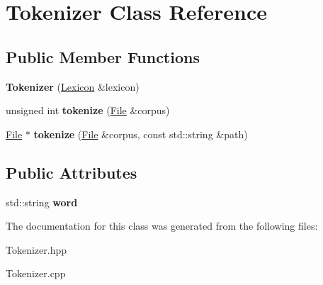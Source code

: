\hypertarget{classTokenizer}{}\section{Tokenizer Class Reference}
\label{classTokenizer}
\subsection*{Public Member Functions}
\begin{DoxyCompactItemize}
\item 
\mbox{\label{classTokenizer_a82cea761b17a4a704faaab9531c3c501}} 
{\bfseries Tokenizer} (\hyperlink{classLexicon}{Lexicon} \&lexicon)
\item 
\mbox{\label{classTokenizer_af918888efe8c82cf983c13c675535859}} 
unsigned int {\bfseries tokenize} (\hyperlink{classFile}{File} \&corpus)
\item 
\mbox{\label{classTokenizer_a9aaf23dcd5b05bebc558f78f7be99ea0}} 
\hyperlink{classFile}{File} $\ast$ {\bfseries tokenize} (\hyperlink{classFile}{File} \&corpus, const std\+::string \&path)
\end{DoxyCompactItemize}
\subsection*{Public Attributes}
\begin{DoxyCompactItemize}
\item 
\mbox{\label{classTokenizer_a18b615fd0e04452cbc124a595ee5d372}} 
std\+::string {\bfseries word}
\end{DoxyCompactItemize}


The documentation for this class was generated from the following files\+:\begin{DoxyCompactItemize}
\item 
Tokenizer.\+hpp\item 
Tokenizer.\+cpp\end{DoxyCompactItemize}
